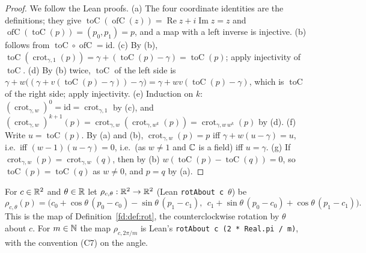 \begin{proof}
We follow the Lean proofs. (a) The four coordinate identities are the definitions; they give
$\operatorname{toC}(\operatorname{ofC}(z))=\operatorname{Re}z+i\operatorname{Im}z=z$ and
$\operatorname{ofC}(\operatorname{toC}(p))=(p_0,p_1)=p$, and a map with a left inverse is injective.
(b) follows from $\operatorname{toC}\circ\operatorname{ofC}=\mathrm{id}$.
(c) By (b), $\operatorname{toC}(\operatorname{crot}_{\gamma,1}(p))=\gamma+(\operatorname{toC}(p)-\gamma)
=\operatorname{toC}(p)$; apply injectivity of $\operatorname{toC}$.
(d) By (b) twice, $\operatorname{toC}$ of the left side is $\gamma+w\bigl((\gamma+v(\operatorname{toC}(p)-\gamma))
-\gamma\bigr)=\gamma+wv(\operatorname{toC}(p)-\gamma)$, which is $\operatorname{toC}$ of the right side; apply
injectivity.
(e) Induction on $k$: $(\operatorname{crot}_{\gamma,w})^0=\mathrm{id}=\operatorname{crot}_{\gamma,1}$ by (c), and
$(\operatorname{crot}_{\gamma,w})^{k+1}(p)=\operatorname{crot}_{\gamma,w}(\operatorname{crot}_{\gamma,w^k}(p))
=\operatorname{crot}_{\gamma,w\,w^k}(p)$ by (d).
(f) Write $u=\operatorname{toC}(p)$. By (a) and (b), $\operatorname{crot}_{\gamma,w}(p)=p$ iff $\gamma+w(u-\gamma)=u$,
i.e.\ iff $(w-1)(u-\gamma)=0$, i.e.\ (as $w\ne1$ and $\mathbb C$ is a field) iff $u=\gamma$.
(g) If $\operatorname{crot}_{\gamma,w}(p)=\operatorname{crot}_{\gamma,w}(q)$, then by (b)
$w(\operatorname{toC}(p)-\operatorname{toC}(q))=0$, so $\operatorname{toC}(p)=\operatorname{toC}(q)$ as $w\ne0$, and
$p=q$ by (a).
\end{proof}

\begin{definition}
\label{ll:def:rot}
For $c\in\mathbb R^2$ and $\theta\in\mathbb R$ let $\rho_{c,\theta}:\mathbb R^2\to\mathbb R^2$ (Lean \texttt{rotAbout c}~$\theta$) be
\[\rho_{c,\theta}(p)=\bigl(c_0+\cos\theta\,(p_0-c_0)-\sin\theta\,(p_1-c_1),\ \
c_1+\sin\theta\,(p_0-c_0)+\cos\theta\,(p_1-c_1)\bigr).\]
This is the map of Definition~\ref{fd:def:rot}, the counterclockwise rotation by $\theta$ about $c$. For $m\in\mathbb N$ the
map $\rho_{c,2\pi/m}$ is Lean's \texttt{rotAbout c (2 * Real.pi / m)}, with the convention (C7) on the angle.
\end{definition}

